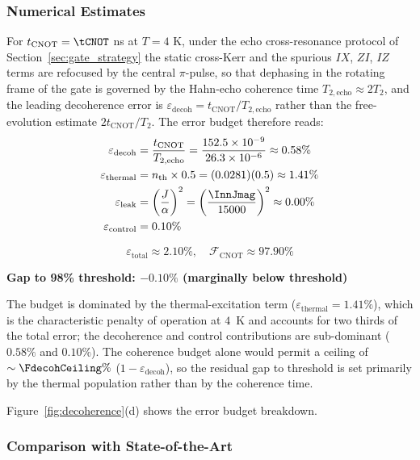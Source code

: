 \subsubsection{Numerical Estimates}

For $t_{\text{CNOT}} = \tCNOT$ ns at $T = 4$ K, under the echo cross-resonance
protocol of Section~\ref{sec:gate_strategy} the static cross-Kerr and the
spurious $IX$, $ZI$, $IZ$ terms are refocused by the central
$\pi$-pulse, so that dephasing in the rotating frame of the gate is
governed by the Hahn-echo coherence time $T_{2,\text{echo}} \approx 2T_2$,
and the leading decoherence error is
$\varepsilon_{\text{decoh}} = t_{\text{CNOT}}/T_{2,\text{echo}}$ rather than
the free-evolution estimate $2t_{\text{CNOT}}/T_2$. The error budget
therefore reads:
\begin{align}
\varepsilon_{\text{decoh}} &= \frac{t_{\text{CNOT}}}{T_{2,\text{echo}}} = \frac{152.5 \times 10^{-9}}{26.3 \times 10^{-6}} \approx 0.58\% \\
\varepsilon_{\text{thermal}} &= n_{\text{th}} \times 0.5 = (0.0281)(0.5) \approx 1.41\% \\
\varepsilon_{\text{leak}} &= \left(\frac{J}{\alpha}\right)^2 = \left(\frac{\InnJmag}{15000}\right)^2 \approx 0.00\% \\
\varepsilon_{\text{control}} &= 0.10\%
\end{align}

\begin{equation}
\varepsilon_{\text{total}} \approx 2.10\%, \quad \boxed{\mathcal{F}_{\text{CNOT}} \approx 97.90\%}
\end{equation}

\textbf{\textcolor{correction}{Gap to 98\% threshold: $-0.10\%$ (marginally below threshold)}}

The budget is dominated by the thermal-excitation term ($\varepsilon_{\text{thermal}}=1.41\%$), which is the characteristic penalty of operation at $4$~K and accounts for two thirds of the total error; the decoherence and control contributions are sub-dominant ($0.58\%$ and $0.10\%$). The coherence budget alone would permit a ceiling of $\sim\FdecohCeiling\%$ ($1-\varepsilon_{\text{decoh}}$), so the residual gap to threshold is set primarily by the thermal population rather than by the coherence time.

Figure~\ref{fig:decoherence}(d) shows the error budget breakdown.

\subsubsection{Comparison with State-of-the-Art}

